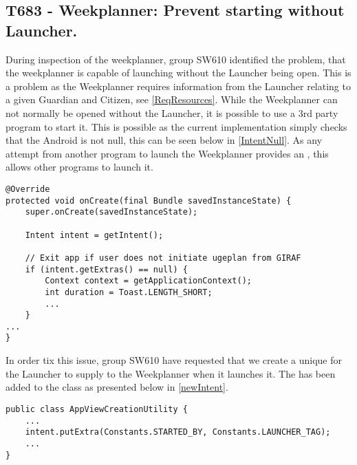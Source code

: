\subsection{T683 - Weekplanner: Prevent starting without Launcher.} 
During inspection of the weekplanner, group SW610 identified the problem, that
the weekplanner is capable of launching without the Launcher being open. This
is a problem as the Weekplanner requires information from the Launcher relating
to a given Guardian and Citizen, see \autoref{ReqResources}. While the
Weekplanner can not normally be opened without the Launcher, it is possible to
use a 3rd party program to start it. This is possible as the current
implementation simply checks that the Android  is not null, this
can be seen below in \autoref{IntentNull}. As any attempt from another program
to launch the Weekplanner provides an , this allows other programs
to launch it.\nl

\begin{minipage}[H]{\linewidth}
\begin{lstlisting}[caption = Current implementation checks that the Intent is not null., label = IntentNull] 
@Override
protected void onCreate(final Bundle savedInstanceState) {
	super.onCreate(savedInstanceState);

    Intent intent = getIntent();

   	// Exit app if user does not initiate ugeplan from GIRAF
    if (intent.getExtras() == null) {               
    	Context context = getApplicationContext();
        int duration = Toast.LENGTH_SHORT;
        ...
    }
...
}
\end{lstlisting}
\end{minipage}

In order tix this issue, group SW610 have requested that we create a unique
 for the Launcher to supply to the Weekplanner when it launches
it. The  has been added to the 
class as presented below in \autoref{newIntent}.\nl

\begin{minipage}[H]{\linewidth}
\begin{lstlisting}[caption = New unique \textc{Intent} for the Launcher., label = newIntent] 
public class AppViewCreationUtility {
	...
	intent.putExtra(Constants.STARTED_BY, Constants.LAUNCHER_TAG);
	...
}
\end{lstlisting}
\end{minipage}


